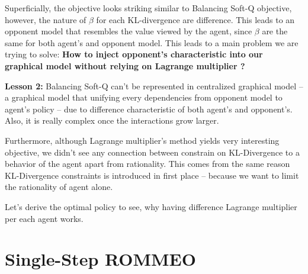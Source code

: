 Superficially, the objective looks striking similar to Balancing Soft-Q objective, however, the nature of $\beta$ for each KL-divergence are difference.  This leads to an opponent model that resembles the value viewed by the agent, since $\beta$ are the same for both agent's and opponent model. This leads to a main problem we are trying to solve: \textbf{How to inject opponent's characteristic into our graphical model without relying on Lagrange multiplier ?}

\begin{tcolorbox}
\textbf{Lesson 2: } Balancing Soft-Q can't be represented in centralized graphical model -- a graphical model that unifying every dependencies from opponent model to agent's policy -- due to difference characteristic of both agent's and opponent's. Also, it is really complex once the interactions grow larger.
\end{tcolorbox}

Furthermore, although Lagrange multiplier's method yields very interesting objective, we didn't see any connection between constrain on KL-Divergence to a behavior of the agent apart from rationality. This comes from the same reason KL-Divergence constraints is introduced in first place -- because we want to limit the rationality of agent alone.

Let's derive the optimal policy to see, why having difference Lagrange multiplier per each agent works.




\section{Single-Step ROMMEO \cite{tian2019regularized}}

